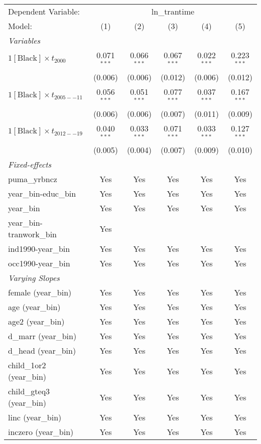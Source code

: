 \begin{tabular}{lccccc}
\tabularnewline\midrule\midrule
Dependent Variable:&\multicolumn{5}{c}{ln\_trantime}\\
Model:&(1) & (2) & (3) & (4) & (5)\\
\midrule \emph{Variables}&   &   &   &   &  \\
$1[\text{Black}] \times t_{2000}$ & 0.071$^{***}$ & 0.066$^{***}$ & 0.067$^{***}$ & 0.022$^{***}$ & 0.223$^{***}$\\
  &(0.006) & (0.006) & (0.012) & (0.006) & (0.012)\\
$1[\text{Black}] \times t_{2005--11}$ & 0.056$^{***}$ & 0.051$^{***}$ & 0.077$^{***}$ & 0.037$^{***}$ & 0.167$^{***}$\\
  &(0.006) & (0.006) & (0.007) & (0.011) & (0.009)\\
$1[\text{Black}] \times t_{2012--19}$ & 0.040$^{***}$ & 0.033$^{***}$ & 0.071$^{***}$ & 0.033$^{***}$ & 0.127$^{***}$\\
  &(0.005) & (0.004) & (0.007) & (0.009) & (0.010)\\
\midrule \emph{Fixed-effects}&   &   &   &   &  \\
puma\_yrbncz & Yes & Yes & Yes & Yes & Yes\\
year\_bin-educ\_bin & Yes & Yes & Yes & Yes & Yes\\
year\_bin & Yes & Yes & Yes & Yes & Yes\\
year\_bin-tranwork\_bin & Yes &  &  &  & \\
ind1990-year\_bin & Yes & Yes & Yes & Yes & Yes\\
occ1990-year\_bin & Yes & Yes & Yes & Yes & Yes\\
\midrule \emph{Varying Slopes}&   &   &   &   &  \\
female (year\_bin) & Yes & Yes & Yes & Yes & Yes\\
age (year\_bin) & Yes & Yes & Yes & Yes & Yes\\
age2 (year\_bin) & Yes & Yes & Yes & Yes & Yes\\
d\_marr (year\_bin) & Yes & Yes & Yes & Yes & Yes\\
d\_head (year\_bin) & Yes & Yes & Yes & Yes & Yes\\
child\_1or2 (year\_bin) & Yes & Yes & Yes & Yes & Yes\\
child\_gteq3 (year\_bin) & Yes & Yes & Yes & Yes & Yes\\
linc (year\_bin) & Yes & Yes & Yes & Yes & Yes\\
inczero (year\_bin) & Yes & Yes & Yes & Yes & Yes\\

\end{tabular}
